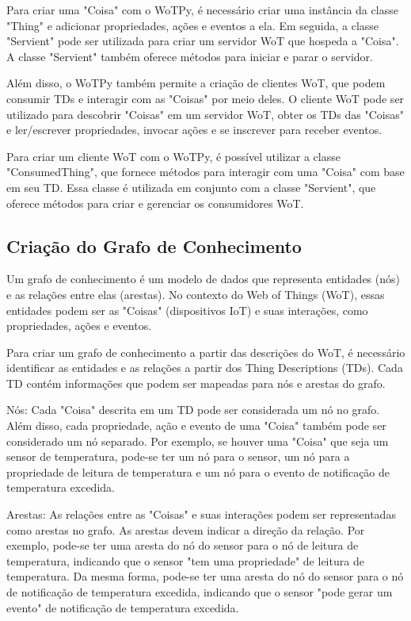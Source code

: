 Para criar uma "Coisa" com o WoTPy, é necessário criar uma instância da classe "Thing" e adicionar propriedades, ações e eventos a ela. Em seguida, a classe "Servient" pode ser utilizada para criar um servidor WoT que hospeda a "Coisa". A classe "Servient" também oferece métodos para iniciar e parar o servidor.

Além disso, o WoTPy também permite a criação de clientes WoT, que podem consumir TDs e interagir com as "Coisas" por meio deles. O cliente WoT pode ser utilizado para descobrir "Coisas" em um servidor WoT, obter os TDs das "Coisas" e ler/escrever propriedades, invocar ações e se inscrever para receber eventos.

Para criar um cliente WoT com o WoTPy, é possível utilizar a classe "ConsumedThing", que fornece métodos para interagir com uma "Coisa" com base em seu TD. Essa classe é utilizada em conjunto com a classe "Servient", que oferece métodos para criar e gerenciar os consumidores WoT.

\subsection{Criação do Grafo de Conhecimento}

Um grafo de conhecimento é um modelo de dados que representa entidades (nós) e as relações entre elas (arestas). No contexto do Web of Things (WoT), essas entidades podem ser as "Coisas" (dispositivos IoT) e suas interações, como propriedades, ações e eventos.

Para criar um grafo de conhecimento a partir das descrições do WoT, é necessário identificar as entidades e as relações a partir dos Thing Descriptions (TDs). Cada TD contém informações que podem ser mapeadas para nós e arestas do grafo.

Nós: Cada "Coisa" descrita em um TD pode ser considerada um nó no grafo. Além disso, cada propriedade, ação e evento de uma "Coisa" também pode ser considerado um nó separado. Por exemplo, se houver uma "Coisa" que seja um sensor de temperatura, pode-se ter um nó para o sensor, um nó para a propriedade de leitura de temperatura e um nó para o evento de notificação de temperatura excedida.

Arestas: As relações entre as "Coisas" e suas interações podem ser representadas como arestas no grafo. As arestas devem indicar a direção da relação. Por exemplo, pode-se ter uma aresta do nó do sensor para o nó de leitura de temperatura, indicando que o sensor "tem uma propriedade" de leitura de temperatura. Da mesma forma, pode-se ter uma aresta do nó do sensor para o nó de notificação de temperatura excedida, indicando que o sensor "pode gerar um evento" de notificação de temperatura excedida.

